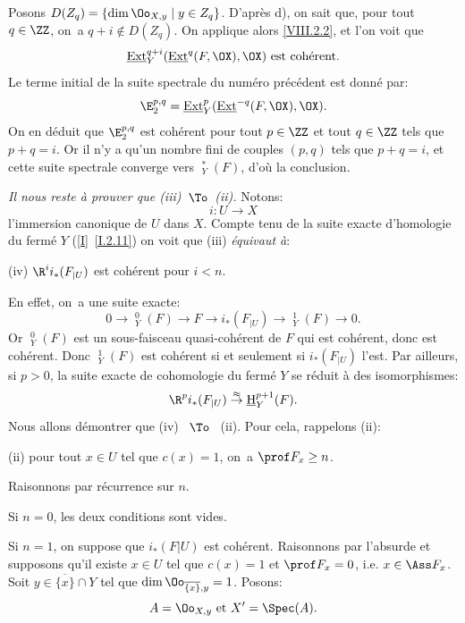 \noindent Posons $D(Z_q)=\{\dim \Oo_{X, y} \mid y\in Z_q\}$. D'apr\`es d), on sait que, pour tout $q\in\ZZ$, on~a $q+i\not\in D(Z_q)$. On applique alors \ref{VIII.2.2}, et l'on voit que
\[
\mathop{\underline{\mathrm{Ext}}}\nolimits^{q+i}_Y(\mathop{\underline{\mathrm{Ext}}}\nolimits^q(F, \OX), \OX) \text{ est cohérent.}\]
Le terme initial de la suite spectrale du num\'ero pr\'ec\'edent est donn\'e par:
\[
\E^{p, q}_2=\mathop{\underline{\mathrm{Ext}}}\nolimits^p_Y(\mathop{\underline{\mathrm{Ext}}}\nolimits^{-q}(F, \OX), \OX).
\]
On en d\'eduit que $\E^{p, q}_2$ est coh\'erent pour tout $p\in\ZZ$ et tout $q\in\ZZ$ tels que $p+q=i$. Or il n'y a qu'un nombre fini de couples $(p, q)$ tels que $p+q=i$, et cette suite spectrale converge vers $\mathop{\underline{\mathrm{H}}}\nolimits^\ast_Y(F)$, d'o\`u la conclusion.

\emph{Il nous reste à prouver que \textup{(iii)}~$\To$~\textup{(ii)}.} Notons:
\[i\colon U\to X\]
l'immersion canonique de $U$ dans $X$. Compte tenu de la suite exacte d'homologie du ferm\'e $Y$ (\ref{I}~\ref{I.2.11}) on voit que (iii) \emph{équivaut à}:

(iv) $\R^ii_\ast(F_{|U})$ est coh\'erent pour $i<n$. \label{condition}

\noindent En effet, on~a une suite exacte:
\[0\to \mathop{\underline{\mathrm{H}}}\nolimits^0_Y(F)\to F \to i_\ast(F_{|U})\to \mathop{\underline{\mathrm{H}}}\nolimits^1_Y(F) \to 0.
\]
Or $\mathop{\underline{\mathrm{H}}}\nolimits^0_Y(F)$ est un sous-faisceau quasi-coh\'erent de $F$ qui est coh\'erent, donc est coh\'erent. Donc $\mathop{\underline{\mathrm{H}}}\nolimits^1_Y(F)$ est coh\'erent si et seulement si $i_\ast(F_{|U})$ l'est. Par ailleurs, si $p>0$, la suite exacte de cohomologie du ferm\'e $Y$ se r\'eduit \`a des isomorphismes:
\[
\R^pi_\ast(F_{|U})\overset{\approx}{\to}\mathop{\underline{\mathrm{H}}}\nolimits^{p+1}_Y(F).
\]
Nous allons d\'emontrer que (iv) ~$\To$~ (ii). Pour cela, rappelons (ii):

(ii) pour tout $x\in U$ tel que $c(x)=1$, on~a $\prof F_x\geq n$.

Raisonnons par r\'ecurrence sur $n$.

Si $n=0$, les deux conditions sont vides.

Si $n=1$, on suppose que $i_\ast(F{|U})$ est coh\'erent. Raisonnons par l'absurde et supposons qu'il existe $x\in U$ tel que $c(x)=1$ et $\prof F_x=0$, i.e. $x\in \Ass F_x$. Soit $y\in\overline{\{x\}}\cap Y$ tel que $\dim \Oo_{\overline{\{x\}}, y}=1$. Posons:
\[A=\Oo_{X, y}\text{ et } X'=\Spec(A).
\]

